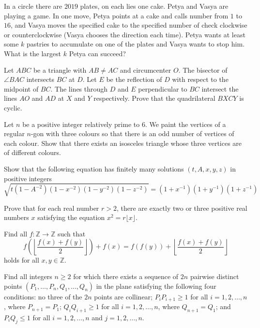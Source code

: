 \documentclass[11pt]{scrartcl}
\begin{document}
\begin{problem}[813804034055493]
In a circle there are $2019$ plates, on each lies one cake. Petya and Vasya are playing a game. In one move, Petya points at a cake and calls number from $1$ to $16$, and Vasya moves the specified cake to the specified number of
check clockwise or counterclockwise (Vasya chooses the direction each time). Petya wants at least some $k$ pastries to accumulate on one of the plates and Vasya wants to stop him. What is the largest $k$ Petya can succeed?
\end{problem}
\begin{problem}[814823180113879]
	Let $ABC$ be a triangle with $AB \neq AC$ and circumcenter $O$. The bisector of $\angle BAC$ intersects $BC$ at $D$. Let $E$ be the reflection of $D$ with respect to the midpoint of $BC$. The lines through $D$ and $E$ perpendicular to $BC$ intersect the lines $AO$ and $AD$ at $X$ and $Y$ respectively. Prove that the quadrilateral $BXCY$ is cyclic.
\end{problem}
\begin{problem}[816006272568007]
	Let $n$ be a positive integer relatively prime to $6$. We paint the vertices of a regular $n$-gon with three colours so that there is an odd number of vertices of each colour. Show that there exists an isosceles triangle whose three vertices are of different colours.
\end{problem}
\begin{problem}[816180108381670]
Show that the following equation has finitely many solutions $(t,A,x,y,z)$ in positive integers
$$\sqrt{t(1-A^{-2})(1-x^{-2})(1-y^{-2})(1-z^{-2})}=(1+x^{-1})(1+y^{-1})(1+z^{-1})$$
\end{problem}
\begin{problem}[816618498838890]
	Prove that for each real number $r>2$, there are exactly two or three positive real numbers $x$ satisfying the equation $x^2=r\lfloor x \rfloor$.
\end{problem}
\begin{problem}[816861285730288]
Find all $f:\mathbb{Z}\to\mathbb{Z}$ such that
\[f\left(\left\lfloor\frac{f(x)+f(y)}{2}\right\rfloor\right)+f(x)=f(f(y))+\left\lfloor\frac{f(x)+f(y)}{2}\right\rfloor\]holds for all $x,y\in\mathbb{Z}$.
\end{problem}
\begin{problem}[817429246000759]
Find all integers $n \geq 2$ for which there exists a sequence of $2n$ pairwise distinct points $(P_1, \dots, P_n, Q_1, \dots, Q_n)$ in the plane satisfying the following four conditions:
no three of the $2n$ points are collinear;
$P_iP_{i+1} \ge 1$ for all $i = 1, 2, \dots ,n$, where $P_{n+1}=P_1$;
$Q_iQ_{i+1} \ge 1$ for all $i = 1, 2, \dots, n$, where $Q_{n+1} = Q_1$; and
$P_iQ_j \le 1$ for all $i = 1, 2, \dots, n$ and $j = 1, 2, \dots, n$.

\end{problem}
\end{document}
